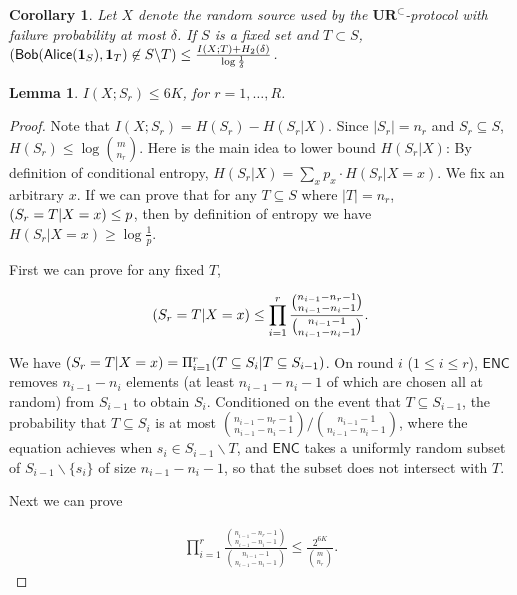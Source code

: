 \documentclass[11pt]{article}
\newtheorem{lemma}{Lemma}
\newtheorem{corollary}{Corollary}
\let\Pr\relax
\DeclareMathOperator*{\Pr}{\mathbb{P}}
\newcommand{\enc}{\textsf{ENC}\xspace}
\newcommand{\sketch}{\mathsf{Alice}}
\newcommand{\query}{\mathsf{Bob}}
\newcommand{\ur}{\mathbf{UR}\xspace}
\begin{document}
\begin{corollary}\label{corollary:sampler-failure}
  Let $X$ denote the random source used by the $\ur^\subset$-protocol with failure probability at most $\delta$. If $S$ is a fixed set and $T\subset S$, $\Pr(\query(\sketch(\mathbf{1}_S), \mathbf{1}_T)\not\in S\backslash T)\le \frac{I(X;T)+H_2(\delta)}{\log\frac{1}{\delta}}$.
\end{corollary}

\begin{lemma}\label{lemma:mutual-entropy-bound}
  $I(X;S_r)\le 6K$, for $r=1,\ldots, R$.
\end{lemma}

\begin{proof}
  Note that $I(X;S_r)=H(S_r)-H(S_r|X)$. Since $|S_r|=n_r$ and $S_r\subseteq S$, $H(S_r)\le \log {m \choose n_r}$. Here is the main idea to lower bound $H(S_r|X)$: By definition of conditional entropy, $H(S_r|X)=\sum_x{p_x\cdot H(S_r|X=x)}$. We fix an arbitrary $x$. If we can prove that for any $T\subseteq S$ where $|T|=n_r$, $\Pr(S_r=T|X=x)\le p$, then by definition of entropy we have $H(S_r|X=x)\ge\log\frac{1}{p}$. 
  
  First we can prove for any fixed $T$,
  
  \begin{align}
    \Pr(S_r=T|X=x)\le \prod_{i=1}^{r}{\frac{{n_{i-1}-n_r-1 \choose n_{i-1}-n_i-1}}{{n_{i-1}-1 \choose n_{i-1}-n_i-1}}}.
  \end{align}
  
  We have $\Pr(S_r=T|X=x)=\Pi_{i=1}^{r}{\Pr(T\subseteq S_i|T\subseteq S_{i-1})}$. 
  On round $i$ ($1\le i \le r$), $\enc$ removes $n_{i-1}-n_i$ elements (at least $n_{i-1}-n_i-1$ of which are chosen all at random) from $S_{i-1}$ to obtain $S_i$. 
  Conditioned on the event that $T\subseteq S_{i-1}$, the probability that $T\subseteq S_i$ is at most ${{n_{i-1}-n_r-1 \choose n_{i-1}-n_i-1}}/{{n_{i-1}-1 \choose n_{i-1}-n_i-1}}$, where the equation achieves when $s_i\in S_{i-1}\backslash T$, and $\enc$ takes a uniformly random subset of $S_{i-1}\backslash \{s_i\}$ of size $n_{i-1}-n_i-1$, so that the subset does not intersect with $T$.
  
  Next we can prove 
  
  \begin{align}
    \prod_{i=1}^{r}{\frac{{n_{i-1}-n_r-1 \choose n_{i-1}-n_i-1}}{{n_{i-1}-1 \choose n_{i-1}-n_i-1}}} \le \frac{2^{6K}}{{m \choose n_r}}. \label{eqn:prod-bound}
  \end{align}
    

\end{proof}
\end{document}
